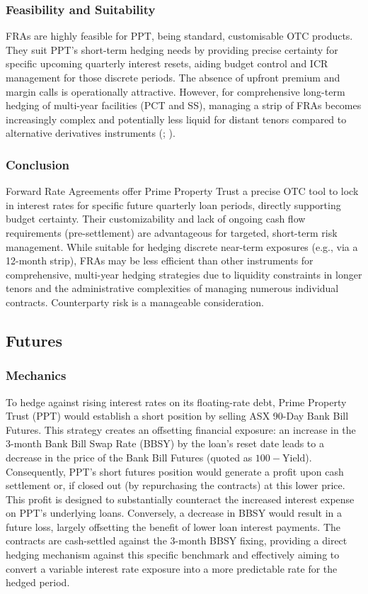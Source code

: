 \documentclass[11pt, a4paper, british]{article}
\begin{document}
\subsubsection{Feasibility and Suitability}
FRAs are highly feasible for PPT, being standard, customisable OTC products. They suit PPT's short-term hedging needs by providing precise certainty for specific upcoming quarterly interest resets, aiding budget control and ICR management for those discrete periods. The absence of upfront premium and margin calls is operationally attractive. However, for comprehensive long-term hedging of multi-year facilities (PCT and SS), managing a strip of FRAs becomes increasingly complex and potentially less liquid for distant tenors compared to alternative derivatives instruments (\cite{fss}; \cite{ss}).

\subsubsection{Conclusion}
Forward Rate Agreements offer Prime Property Trust a precise OTC tool to lock in interest rates for specific future quarterly loan periods, directly supporting budget certainty. Their customizability and lack of ongoing cash flow requirements (pre-settlement) are advantageous for targeted, short-term risk management. While suitable for hedging discrete near-term exposures (e.g., via a 12-month strip), FRAs may be less efficient than other instruments for comprehensive, multi-year hedging strategies due to liquidity constraints in longer tenors and the administrative complexities of managing numerous individual contracts. Counterparty risk is a manageable consideration.

\newpage

\subsection{Futures}

\subsubsection{Mechanics}
To hedge against rising interest rates on its floating-rate debt, Prime Property Trust (PPT) would establish a short position by selling ASX 90-Day Bank Bill Futures. This strategy creates an offsetting financial exposure: an increase in the 3-month Bank Bill Swap Rate (BBSY) by the loan's reset date leads to a decrease in the price of the Bank Bill Futures (quoted as $100 - \text{Yield}$). Consequently, PPT's short futures position would generate a profit upon cash settlement or, if closed out (by repurchasing the contracts) at this lower price. This profit is designed to substantially counteract the increased interest expense on PPT's underlying loans. Conversely, a decrease in BBSY would result in a future loss, largely offsetting the benefit of lower loan interest payments. The contracts are cash-settled against the 3-month BBSY fixing, providing a direct hedging mechanism against this specific benchmark and effectively aiming to convert a variable interest rate exposure into a more predictable rate for the hedged period.
\end{document}
